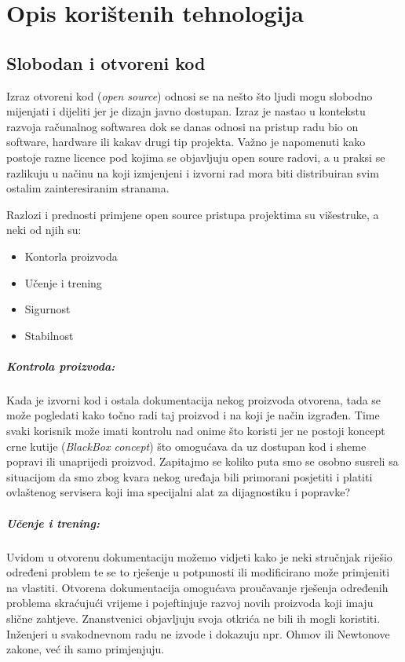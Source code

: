 \chapter{Opis korištenih tehnologija}\label{technologyStack}
\section{Slobodan i otvoreni kod}
Izraz otvoreni kod (\textit{open source}) odnosi se na nešto što ljudi mogu slobodno mijenjati i dijeliti jer je dizajn javno dostupan\cite{WhatIsOpenSource}.
Izraz je nastao u kontekstu razvoja računalnog softwarea dok se danas odnosi na pristup radu bio on software, hardware ili kakav drugi tip projekta.
Važno je napomenuti kako postoje razne licence pod kojima se objavljuju open soure radovi, a u praksi se razlikuju u načinu na koji izmjenjeni i izvorni rad mora biti distribuiran svim ostalim zainteresiranim stranama.

Razlozi i prednosti primjene open source pristupa projektima su višestruke, a neki od njih su:
\begin{itemize}
\item Kontorla proizvoda
\item Učenje i trening
\item Sigurnost
\item Stabilnost
\end{itemize}

\paragraph{Kontrola proizvoda:}
Kada je izvorni kod i ostala dokumentacija nekog proizvoda otvorena, tada se može pogledati kako točno radi taj proizvod i na koji je način izgrađen.
Time svaki korisnik može imati kontrolu nad onime što koristi jer ne postoji koncept crne kutije (\textit{BlackBox concept}) što omogućava da uz dostupan kod i sheme popravi ili unaprijedi proizvod.
Zapitajmo se koliko puta smo se osobno susreli sa situacijom da smo zbog kvara nekog uređaja bili primorani posjetiti i platiti ovlaštenog servisera koji ima specijalni alat za dijagnostiku i popravke?

\paragraph{Učenje i trening:}
Uvidom u otvorenu dokumentaciju možemo vidjeti kako je neki stručnjak riješio određeni problem te se to rješenje u potpunosti ili modificirano može primjeniti na vlastiti.
Otvorena dokumentacija omogućava proučavanje rješenja određenih problema skraćujući vrijeme i pojeftinjuje razvoj novih proizvoda koji imaju slične zahtjeve.
Znanstvenici objavljuju svoja otkrića ne bili ih mogli koristiti.
Inženjeri u svakodnevnom radu ne izvode i dokazuju npr. Ohmov ili Newtonove zakone, već ih samo primjenjuju.

